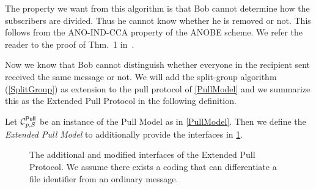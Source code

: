 The property we want from this algorithm is that Bob cannot determine how the 
subscribers are divided.
Thus he cannot know whether he is removed or not.
This follows from the ANO-IND-CCA property of the \ac{ANOBE} scheme.
We refer the reader to the proof of Thm.~1 in~\cite{ANOBE}.

Now we know that Bob cannot distinguish whether everyone in the recipient sent 
received the same message or not.
We will add the split-group algorithm (\cref{SplitGroup}) as extension to the 
pull protocol of \cref{PullModel} and we summarize this as the Extended Pull 
Protocol in the following definition.

\begin{definition}\label{ExtPullModel}
  Let \(\Pull[p, S]\) be an instance of the Pull Model as in \cref{PullModel}.
  Then we define the \emph{Extended Pull Model} to additionally provide the 
  interfaces in \cref{ExtPullFunctions}.
\end{definition}

\begin{figure}
  \caption{%
    The additional and modified interfaces of the Extended Pull Protocol.
    We assume there exists a coding that can differentiate a file identifier 
    from an ordinary message.
  }\label{ExtPullFunctions}
\end{figure}

